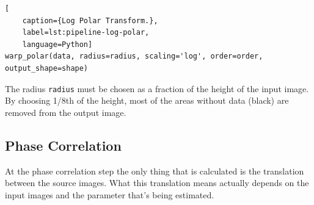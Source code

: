 \begin{lstlisting}[
    caption={Log Polar Transform.},
    label=lst:pipeline-log-polar,
    language=Python]
warp_polar(data, radius=radius, scaling='log', order=order, output_shape=shape)
\end{lstlisting}

The radius \lstinline{radius} must be chosen as a fraction of the height of the input image. By choosing 1/8th of the height, most of the areas without data (black) are removed from the output image. 


\subsection{Phase Correlation}

At the phase correlation step the only thing that is calculated is the translation between the source images. What this translation means actually depends on the input images and the parameter that's being estimated.

